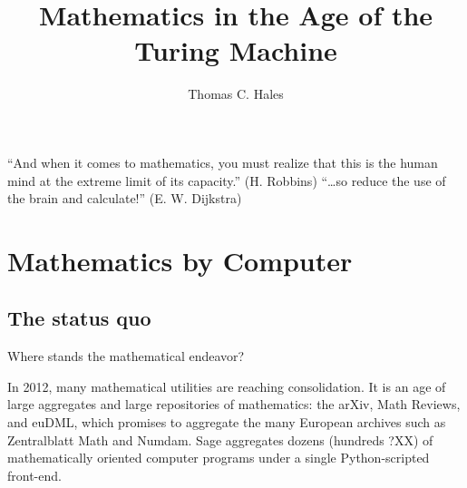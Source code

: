 \documentclass{llncs}
\begin{document}
\title{Mathematics in the Age of the Turing Machine}
\author{Thomas C. Hales\cite{Research supported in part by NSF Grant XX and the Benter Foundation.}}
\maketitle


\section*{}

{

\narrower

\it

``And when it comes to mathematics, you must realize that this is the human mind
at the extreme limit of its capacity.'' (H. Robbins) ``\ldots so reduce the use of
the brain and calculate!'' (E. W. Dijkstra)

}


\section{Mathematics by Computer}

\subsection{The status quo}

Where stands the mathematical endeavor?

In 2012, many mathematical utilities are reaching consolidation.
It is an age of large aggregates and large repositories
of mathematics: the arXiv, Math Reviews, and euDML, which promises to
aggregate the many European archives such as Zentralblatt Math and Numdam.
Sage aggregates dozens (hundreds ?XX) of mathematically oriented computer programs
under a single Python-scripted front-end.

\end{document}
